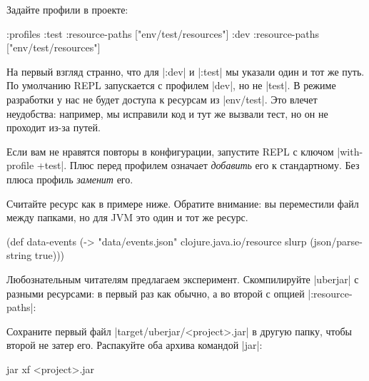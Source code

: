 Задайте профили в проекте:

\begin{english}
  \begin{clojure}
:profiles {:test {:resource-paths ["env/test/resources"]}
           :dev  {:resource-paths ["env/test/resources"]}}
  \end{clojure}
\end{english}

На первый взгляд странно, что для \spverb|:dev| и \spverb|:test| мы указали один
и тот же путь. По умолчанию REPL запускается с профилем \spverb|dev|, но не
\spverb|test|. В режиме разработки у нас не будет доступа к ресурсам из
\spverb|env/test|. Это влечет неудобства: например, мы исправили код и тут же
вызвали тест, но он не проходит из-за путей.

Если вам не нравятся повторы в конфигурации, запустите REPL с ключом
\spverb|with-profile +test|. Плюс перед профилем означает \emph{добавить} его к
стандартному. Без плюса профиль \emph{заменит} его.

Считайте ресурс как в примере ниже. Обратите внимание: вы переместили файл между
папками, но для JVM это один и тот же ресурс.

\begin{english}
  \begin{clojure}
(def data-events
  (-> "data/events.json"
      clojure.java.io/resource
      slurp
      (json/parse-string true)))
  \end{clojure}
\end{english}

Любознательным читателям предлагаем эксперимент. Скомпилируйте \spverb|uberjar|
с разными ресурсами: в первый раз как обычно, а во второй с опцией
\spverb|:resource-paths|:

\begin{english}
  \begin{clojure}
:profiles {:uberjar {:resource-paths ["env/test/resources"]}
  \end{clojure}
\end{english}

Сохраните первый файл \spverb|target/uberjar/<project>.jar| в другую папку,
чтобы второй не затер его. Распакуйте оба архива командой \spverb|jar|:

\begin{english}
  \begin{bash}
jar xf <project>.jar
  \end{bash}
\end{english}

